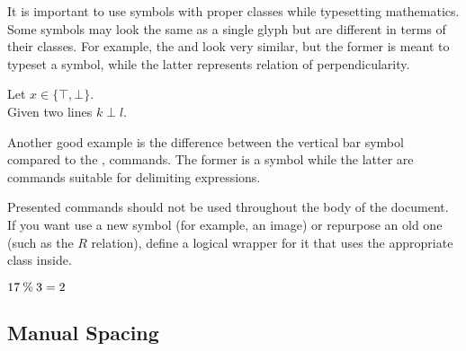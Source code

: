 It is important to use symbols with proper classes while typesetting
mathematics. Some symbols may look the same as a single glyph but are different
in terms of their classes. For example, the  and  look very
similar, but the former is meant to typeset a symbol, while the latter
represents relation of perpendicularity.
\begin{example}
Let \(x \in \{\top, \bot\}\).
\\ %
Given two lines \(k \perp l\).
\end{example}
Another good example is the difference between the vertical bar symbol \ai{|}
compared to the ,  commands. The former is a symbol while
the latter are commands suitable for delimiting expressions.

Presented commands should not be used throughout the body of the document. If
you want use a new symbol (for example, an image) or repurpose an old one (such
as the \(R\) relation), define a logical wrapper for it that uses the
appropriate class inside.
\begin{example}
\NewDocumentCommand{\modulo}{}{%
  \mathbin{\%}%
}
\( 17 \modulo 3 = 2 \)
\end{example}

\subsection{Manual Spacing}

